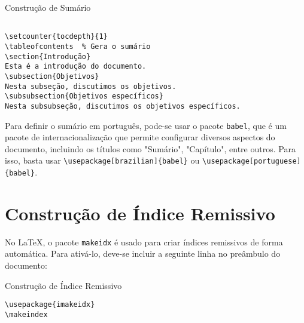 \begin{trailer}{Constru\c c\~ao de Sum\'ario}
\begin{verbatim} 

\setcounter{tocdepth}{1}
\tableofcontents  % Gera o sumário
\section{Introdução}
Esta é a introdução do documento.
\subsection{Objetivos}
Nesta subseção, discutimos os objetivos.
\subsubsection{Objetivos específicos}
Nesta subsubseção, discutimos os objetivos específicos. 
 \end{verbatim}
\end{trailer}

\noindent Para definir o sumário em português, pode-se usar o pacote \verb|babel|, que é um pacote de internacionalização que permite configurar diversos aspectos do documento, incluindo os títulos como "Sumário", "Capítulo", entre outros. Para isso, basta usar \verb|\usepackage[brazilian]{babel}| ou \verb|\usepackage[portuguese]{babel}|.



\section{Constru\c c\~ao de \'Indice Remissivo}
\label{sec:2}

No \LaTeX{}, o pacote \verb|makeidx| é usado para criar índices remissivos de forma automática. Para ativá-lo, deve-se incluir a seguinte linha no preâmbulo do documento:

\begin{trailer}{Constru\c c\~ao de \'Indice Remissivo}
\begin{verbatim} 
\usepackage{imakeidx}
\makeindex \end{verbatim}
\end{trailer}


